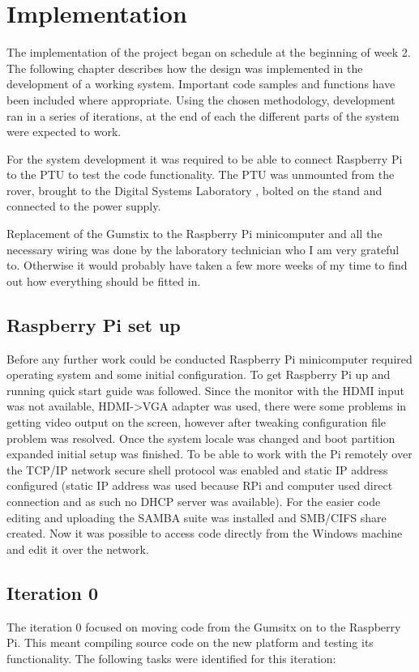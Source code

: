 \chapter{Implementation}
The implementation of the project began on schedule at the beginning of week 2. The following chapter describes how the design was implemented in the development of a working system. Important code samples and functions have been included where appropriate. Using the chosen methodology, development ran in a series of iterations, at the end of each the different parts of the system were expected to work.

For the system development it was required to be able to connect Raspberry Pi to the PTU to test the code functionality. The PTU was unmounted from the rover, brought to the Digital Systems Laboratory , bolted on the stand and connected to the power supply.

Replacement of the Gumstix to the Raspberry Pi minicomputer and all the necessary wiring was done by the laboratory technician who I am very grateful to. Otherwise it would probably have taken a few more weeks of my time to find out how everything should be fitted in. 

\section{Raspberry Pi set up}
Before any further work could be conducted Raspberry Pi minicomputer required operating system and some initial configuration. To get Raspberry Pi up and running quick start guide \cite{RPiQuickStart} was followed. Since the monitor with the HDMI input was not available, HDMI->VGA adapter was used, there were some problems in getting video output on the screen, however after tweaking configuration file problem was resolved. Once the system locale was changed and boot partition expanded initial setup was finished. To be able to work with the Pi remotely over the TCP/IP network secure shell protocol was enabled and static IP address configured (static IP address was used because RPi and computer used direct connection and as such no DHCP server was available). For the easier code editing and uploading the SAMBA suite was installed and SMB/CIFS share created. Now it was possible to access code directly from the Windows machine and edit it over the network.  

\section{Iteration 0}
The iteration 0 focused on moving code from the Gumsitx on to the Raspberry Pi. This meant compiling source code on the new platform and testing its functionality. 
The following tasks were identified for this iteration:

